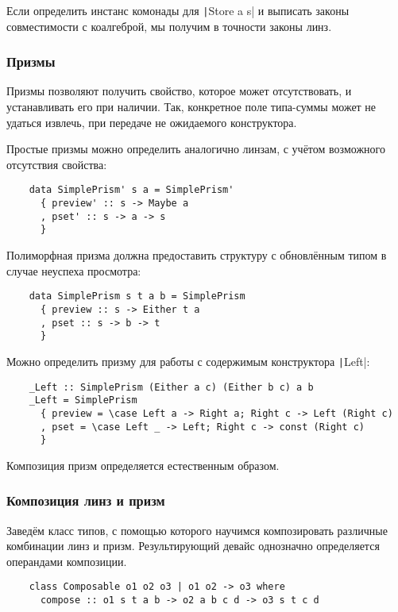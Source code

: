 Если определить инстанс комонады для \texttt|Store a s| и выписать законы совместимости с коалгеброй, мы получим в точности законы линз.

\subsubsection{Призмы}

Призмы позволяют получить свойство, которое может отсутствовать, и устанавливать его при наличии.
Так, конкретное поле типа-суммы может не удаться извлечь, при передаче не ожидаемого конструктора.

Простые призмы можно определить аналогично линзам, с учётом возможного отсутствия свойства:

\begin{verbatim}
    data SimplePrism' s a = SimplePrism'
      { preview' :: s -> Maybe a
      , pset' :: s -> a -> s
      }
\end{verbatim}

Полиморфная призма должна предоставить структуру с обновлённым типом в случае неуспеха просмотра:
\begin{verbatim}
    data SimplePrism s t a b = SimplePrism
      { preview :: s -> Either t a
      , pset :: s -> b -> t
      }
\end{verbatim}

Можно определить призму для работы с содержимым конструктора \texttt|Left|:
\begin{verbatim}
    _Left :: SimplePrism (Either a c) (Either b c) a b
    _Left = SimplePrism
      { preview = \case Left a -> Right a; Right c -> Left (Right c)
      , pset = \case Left _ -> Left; Right c -> const (Right c)
      }
\end{verbatim}

Композиция призм определяется естественным образом.

\subsubsection{Композиция линз и призм}

Заведём класс типов, с помощью которого научимся композировать различные комбинации линз и призм.
Результирующий девайс однозначно определяется операндами композиции.

\begin{verbatim}
    class Composable o1 o2 o3 | o1 o2 -> o3 where
      compose :: o1 s t a b -> o2 a b c d -> o3 s t c d
\end{verbatim}

